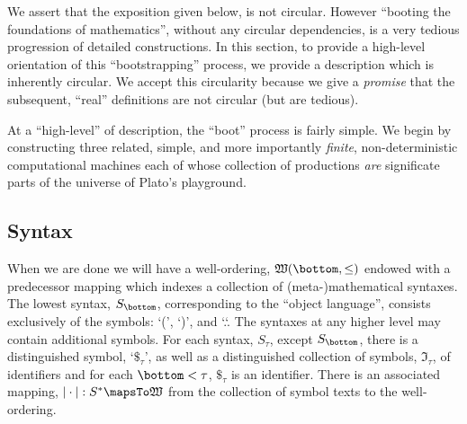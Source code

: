 We assert that the exposition given below, is not circular. However ``booting
the foundations of mathematics''\footnotemark, without any circular
dependencies, is a very tedious progression of detailed constructions. In this
section, to provide a high-level orientation of this ``bootstrapping'' process,
we provide a description which is inherently circular. We accept this
circularity because we give a \emph{promise} that the subsequent, ``real''
definitions are not circular (but are tedious).


At a ``high-level'' of description, the ``boot'' process is fairly simple. We
begin by constructing three related, simple, and more importantly \emph{finite},
non-deterministic computational machines each of whose collection of productions
\emph{are} significate parts of the universe of Plato's playground.

\subsection{Syntax}

When we are done we will have a well-ordering, $\mathfrak{W}(\bottom, \le)$
endowed with a predecessor mapping which indexes a collection of
(meta-)mathematical syntaxes. The lowest syntax, $S_{\bottom}$, corresponding to
the ``object language'', consists exclusively of the symbols: `(', `)', and `.`.
The syntaxes at any higher level may contain additional symbols. For each
syntax, $S_{\tau}$, except $S_{\bottom}$, there is a distinguished symbol,
`$\$_{\tau}$', as well as a distinguished collection of symbols,
$\mathfrak{I}_{\tau}$, of identifiers and for each $\bottom < \tau$, $\$_{\tau}$
is an identifier. There is an associated mapping, $|\cdot | : S^* \mapsTo
\mathfrak{W}$ from the collection of symbol texts to the well-ordering.

